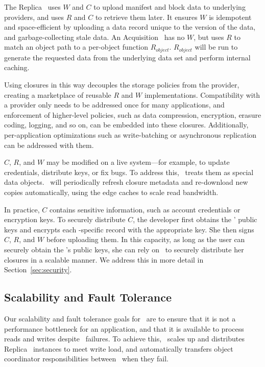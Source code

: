 The Replica \SG\ uses $W$ and $C$ to upload manifest and block data
to underlying providers, and uses $R$ and $C$ to retrieve them later.
It ensures $W$ is idempotent and space-efficient by uploading a data record
unique to the version of the data, and garbage-collecting stale data.
An Acquisition \SG\ has no $W$, but uses $R$ to match an object path 
to a per-object function $R_{object}$.  $R_{object}$ will be run 
to generate the requested data from the underlying data set and perform internal caching.

Using closures in this way decouples the storage policies from the provider,
creating a marketplace of reusable $R$ and $W$ implementations.
Compatibility with a provider only needs to be addressed once for many applications,
and enforcement of higher-level policies, such as data compression, encryption,
erasure coding, logging, and so on, can be embedded into these closures.
Additionally, per-application optimizations such as write-batching 
or asynchronous replication can be addressed with them.

$C$, $R$, and $W$ may be modified
on a live system---for example, to update credentials, distribute keys, or fix bugs.
To address this, \Syndicate\ treats them as special data objects. \SGs\ will
periodically refresh closure metadata and re-download new copies automatically,
using the edge caches to scale read bandwidth.

In practice, $C$ contains sensitive information, such as account credentials
or encryption keys.  To securely distribute $C$, the developer first 
obtains the \SGs' public keys and encrypts each \SG-specific record
with the appropriate key.  She then signs $C$, $R$, and $W$ before uploading them.
In this capacity, as long as the user can securely obtain the \SG's public keys,
she can rely on \Syndicate\ to securely distribute her closures in a scalable manner.  We address this in more detail in Section~\ref{sec:security}.

\subsection{Scalability and Fault Tolerance}
\label{sec:controlplane}

Our scalability and fault tolerance goals for \Syndicate\ are to ensure that 
it is not a performance bottleneck for an application, and that 
it is available to process reads and writes despite \SG\ failures.
To achieve this, \Syndicate\ scales up and distributes Replica
\SG\ instances to meet write load, and automatically transfers object coordinator
responsibilities between \SGs\ when they fail.

